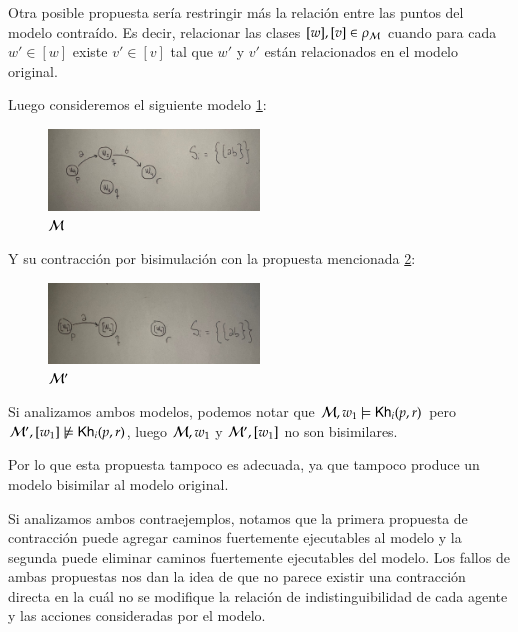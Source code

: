 Otra posible propuesta sería restringir más la relación entre las puntos del modelo contraído. Es decir, relacionar las clases 
$[w], [v] \in \rho_{\mathcal{M}}$ cuando para cada $w' \in [w]$ existe $v' \in [v]$ tal que $w'$ y $v'$ están relacionados en el modelo original.

Luego consideremos el siguiente modelo \ref{fig:2nd_proposal_original}:

\begin{figure}[h]
    \centering
    \includegraphics[width=0.5\textwidth]{imagenes/2da_propuesta_original.jpeg}
    \caption{$\mathcal{M}$}
    \label{fig:2nd_proposal_original}
\end{figure}

Y su contracción por bisimulación con la propuesta mencionada \ref{fig:2nd_proposal_contraction}:

\begin{figure}[h]
    \centering
    \includegraphics[width=0.5\textwidth]{imagenes/2da_propuesta_contraido.jpeg}
    \caption{$\mathcal{M}'$}
    \label{fig:2nd_proposal_contraction}
\end{figure}

Si analizamos ambos modelos, podemos notar que $\mathcal{M},w_1 \models \mathsf{Kh}_i(p,r)$ pero $\mathcal{M}',[w_1] \not\models \mathsf{Kh}_i(p,r)$, luego 
$\mathcal{M},w_1$ y $\mathcal{M}',[w_1]$ no son bisimilares.

Por lo que esta propuesta tampoco es adecuada, ya que tampoco produce un modelo bisimilar al modelo original.

Si analizamos ambos contraejemplos, notamos que la primera propuesta de contracción puede agregar caminos fuertemente ejecutables al modelo y la segunda puede eliminar 
caminos fuertemente ejecutables del modelo. Los fallos de ambas propuestas nos dan la idea de que no parece existir una contracción directa en la cuál 
no se modifique la relación de indistinguibilidad de cada agente y las acciones consideradas por el modelo. 


